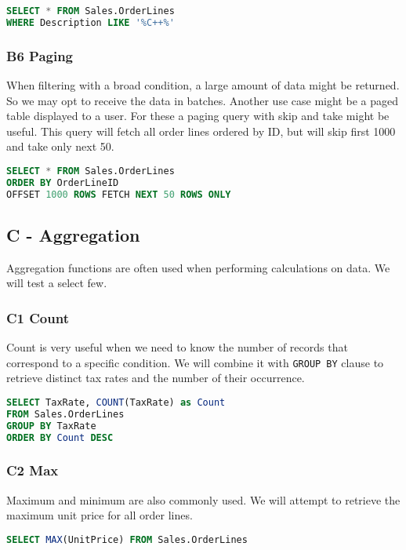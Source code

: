 \begin{lstlisting}[language=SQL]
SELECT * FROM Sales.OrderLines 
WHERE Description LIKE '%C++%'
\end{lstlisting}

\subsubsection*{B6 Paging} \label{query:b6}
When filtering with a broad condition, a large amount of data might be returned. So we may opt to receive the data in batches. Another use case might be a paged table displayed to a user. For these a paging query with skip and take might be useful.
This query will fetch all order lines ordered by ID, but will skip first 1000 and take only next 50.

\begin{lstlisting}[language=SQL]
SELECT * FROM Sales.OrderLines 
ORDER BY OrderLineID 
OFFSET 1000 ROWS FETCH NEXT 50 ROWS ONLY
\end{lstlisting}

\subsection{C - Aggregation} \label{query:}
Aggregation functions are often used when performing calculations on data. We will test a select few.

\subsubsection*{C1 Count} \label{query:c1}
Count is very useful when we need to know the number of records that correspond to a specific condition. We will combine it with \texttt{GROUP BY} clause to retrieve distinct tax rates and the number of their occurrence.

\begin{lstlisting}[language=SQL]
SELECT TaxRate, COUNT(TaxRate) as Count 
FROM Sales.OrderLines 
GROUP BY TaxRate 
ORDER BY Count DESC
\end{lstlisting}

\subsubsection*{C2 Max}  \label{query:c2}
Maximum and minimum are also commonly used. We will attempt to retrieve the maximum unit price for all order lines.

\begin{lstlisting}[language=SQL]
SELECT MAX(UnitPrice) FROM Sales.OrderLines
\end{lstlisting}

